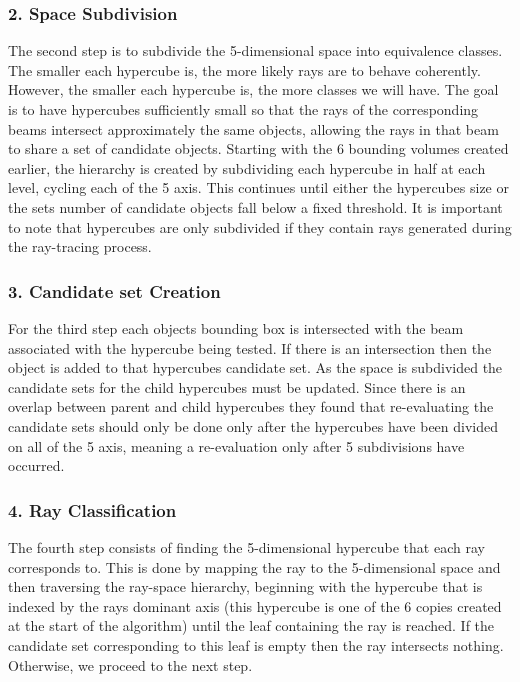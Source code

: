 \subsubsection{2. Space Subdivision}

The second step is to subdivide the 5-dimensional space into equivalence classes. The smaller each hypercube is, the more likely rays are to behave coherently. However, the smaller each hypercube is, the more classes we will have. The goal is to have hypercubes sufficiently small so that the rays of the corresponding beams intersect approximately the same objects, allowing the rays in that beam to share a set of candidate objects. Starting with the 6 bounding volumes created earlier, the hierarchy is created by subdividing each hypercube in half at each level, cycling each of the 5 axis. This continues until either the hypercubes size or the sets number of candidate objects fall below a fixed threshold. It is important to note that hypercubes are only subdivided if they contain rays generated during the ray-tracing process.

\subsubsection{3. Candidate set Creation}

For the third step each objects bounding box is intersected with the beam associated with the hypercube being tested. If there is an intersection then the object is added to that hypercubes candidate set. As the space is subdivided the candidate sets for the child hypercubes must be updated. Since there is an overlap between parent and child hypercubes they found that re-evaluating the candidate sets should only be done only after the hypercubes have been divided on all of the 5 axis, meaning a re-evaluation only after 5 subdivisions have occurred.

\subsubsection{4. Ray Classification}

The fourth step consists of finding the 5-dimensional hypercube that each ray corresponds to. This is done by mapping the ray to the 5-dimensional space and then traversing the ray-space hierarchy, beginning with the hypercube that is indexed by the rays dominant axis (this hypercube is one of the 6 copies created at the start of the algorithm) until the leaf containing the ray is reached. If the candidate set corresponding to this leaf is empty then the ray intersects nothing. Otherwise, we proceed to the next step.

